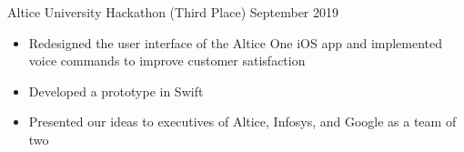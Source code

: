 \documentclass{article}
\begin{document}
\noindent
Altice University Hackathon (Third Place)
\hfill
September 2019\\
\vspace{-1em}
\begin{itemize}
\item Redesigned the user interface of the Altice One iOS app and implemented voice commands to improve customer satisfaction
\item Developed a prototype in Swift
\item Presented our ideas to executives of Altice, Infosys, and Google as a team of two
\end{itemize}


\iffalse %

\noindent
Altice - Infosys University Hackathon (Third Place)
\hfill
November 2018\\
\vspace{-1em}
\begin{itemize}
\item Implemented better accessibility options in websites, mobile apps, and Internet of Things devices to improve customer acquisition rates and avoid potential lawsuits
\item Developed a prototype using JavaScript and CSS
\item Presented our ideas to executives of Altice and Infosys as a team of four
\end{itemize}

\fi


\noindent
\end{document}
